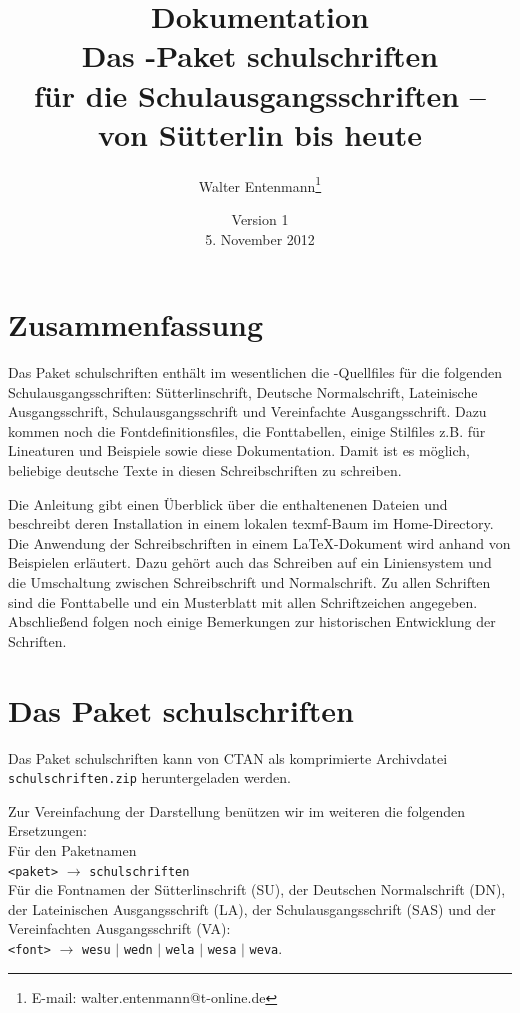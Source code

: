\documentclass[12pt,titlepage]{article}
\begin{document}
\renewcommand{\figurename}{Bild}

\title{{\huge\bfseries Dokumentation}\\[5mm]
Das \MF-Paket {\sffamily\bfseries schulschriften}\\
f\"ur die Schulausgangsschriften --\\
 von S\"utterlin bis heute}
\author{Walter Entenmann\thanks{E-mail: walter.entenmann@t-online.de}}
\date{Version 1\\5. November 2012}
\maketitle

\newpage
\section*{Zusammenfassung}
Das Paket {\sffamily schulschriften}  enth\"alt  im wesentlichen 
die \MF-Quellfiles
f\"ur die folgenden Schulausgangsschriften:
S\"utterlinschrift, Deutsche Normalschrift, 
Lateinische Ausgangsschrift, Schulausgangsschrift und 
Vereinfachte Ausgangsschrift. Dazu kommen noch
die Fontdefinitionsfiles, die Fonttabellen, 
einige Stilfiles z.B. f\"ur Lineaturen und
Beispiele sowie diese Dokumentation. 
Damit ist es m\"oglich, beliebige deutsche Texte in diesen
Schreibschriften zu schreiben.

Die Anleitung gibt  einen \"Uberblick \"uber die enthaltenenen Dateien
und beschreibt deren Installation in einem lokalen texmf-Baum im
Home-Directory.
Die Anwendung der Schreibschriften in einem \LaTeX-Dokument wird
anhand von Beispielen erl\"autert. 
Dazu geh\"ort auch das Schreiben auf ein Liniensystem und die
Umschaltung zwischen Schreibschrift und Normalschrift.
Zu allen Schriften sind die Fonttabelle und ein
Musterblatt mit allen Schriftzeichen angegeben.
Abschlie\ss{}end folgen noch  einige Bemerkungen zur historischen  Entwicklung
der Schriften.

\section{Das Paket {\sffamily schulschriften}}
Das Paket {\sffamily schulschriften} kann von CTAN \cite{11} als komprimierte
Archivdatei \verb+schulschriften.zip+ heruntergeladen werden.

Zur Vereinfachung der Darstellung ben\"utzen wir im weiteren die
folgenden Ersetzungen:\\
F\"ur den Paketnamen\\
\verb+<paket>+  $\longrightarrow$  \verb+schulschriften+\\
F\"ur die Fontnamen der S\"utterlinschrift (SU), der Deutschen
Normalschrift (DN), der Lateinischen Ausgangsschrift (LA), der
Schulausgangsschrift (SAS) und der Vereinfachten Ausgangsschrift (VA):\\
\verb+<font>+  $\longrightarrow$ \verb+wesu+ $|$ \verb+wedn+ $|$
\verb+wela+ $|$ \verb+wesa+ $|$ \verb+weva+.
\end{document}
